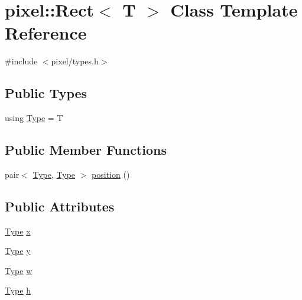 \hypertarget{classpixel_1_1_rect}{}\section{pixel\+:\+:Rect$<$ T $>$ Class Template Reference}
\label{classpixel_1_1_rect}


{\ttfamily \#include $<$pixel/types.\+h$>$}

\subsection*{Public Types}
\begin{DoxyCompactItemize}
\item 
using \hyperlink{classpixel_1_1_rect_a7890b7a80decee4efccf587d4f5b13d7}{Type} = T
\end{DoxyCompactItemize}
\subsection*{Public Member Functions}
\begin{DoxyCompactItemize}
\item 
pair$<$ \hyperlink{classpixel_1_1_rect_a7890b7a80decee4efccf587d4f5b13d7}{Type}, \hyperlink{classpixel_1_1_rect_a7890b7a80decee4efccf587d4f5b13d7}{Type} $>$ \hyperlink{classpixel_1_1_rect_a0c7a21247e59915c90c3dfec87bdfd06}{position} ()
\end{DoxyCompactItemize}
\subsection*{Public Attributes}
\begin{DoxyCompactItemize}
\item 
\hyperlink{classpixel_1_1_rect_a7890b7a80decee4efccf587d4f5b13d7}{Type} \hyperlink{classpixel_1_1_rect_aa669ab32cd83ec71e5aafc37b96d7cc2}{x}
\item 
\hyperlink{classpixel_1_1_rect_a7890b7a80decee4efccf587d4f5b13d7}{Type} \hyperlink{classpixel_1_1_rect_a47576f166846e700691b44c53de3de91}{y}
\item 
\hyperlink{classpixel_1_1_rect_a7890b7a80decee4efccf587d4f5b13d7}{Type} \hyperlink{classpixel_1_1_rect_a88eb5fb07e4aea4b1d9835c1da9bec0f}{w}
\item 
\hyperlink{classpixel_1_1_rect_a7890b7a80decee4efccf587d4f5b13d7}{Type} \hyperlink{classpixel_1_1_rect_a8e6880af060867afddd02408703cd03b}{h}
\end{DoxyCompactItemize}


